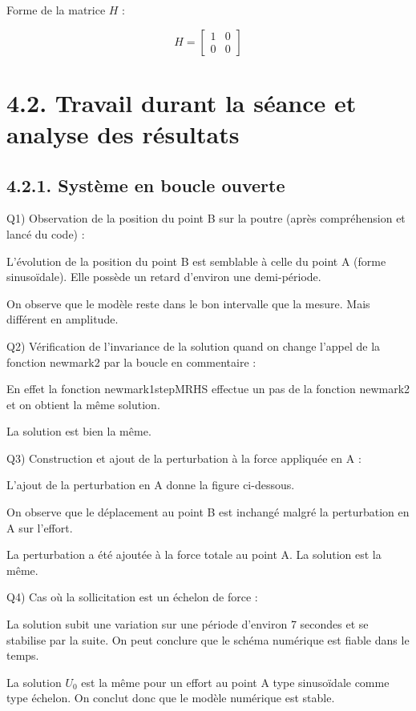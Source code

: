 \documentclass{rapportECL}
\begin{document}
Forme de la matrice $H$ :

\[ H = \begin{bmatrix} 1 & 0 \\ 0 & 0 \end{bmatrix} \]

\section{4.2. Travail durant la s\'eance et analyse des r\'esultats}

\subsection{4.2.1. Syst\`eme en boucle ouverte}

Q1) Observation de la position du point B sur la poutre (apr\`es compr\'ehension et lanc\'e du code) :

L'\'evolution de la position du point B est semblable \`a celle du point A (forme sinuso\"idale). Elle poss\`ede un retard d'environ une demi-p\'eriode.

On observe que le mod\`ele reste dans le bon intervalle que la mesure. Mais diff\'erent en amplitude.

Q2) V\'erification de l'invariance de la solution quand on change l'appel de la fonction newmark2 par la boucle en commentaire :

En effet la fonction newmark1stepMRHS effectue un pas de la fonction newmark2 et on obtient la m\^eme solution.

La solution est bien la m\^eme.

Q3) Construction et ajout de la perturbation \`a la force appliqu\'ee en A :

L'ajout de la perturbation en A donne la figure ci-dessous.

On observe que le d\'eplacement au point B est inchang\'e malgr\'e la perturbation en A sur l'effort.

La perturbation a \'et\'e ajout\'ee \`a la force totale au point A. La solution est la m\^eme.

Q4) Cas o\`u la sollicitation est un \'echelon de force :

La solution subit une variation sur une p\'eriode d'environ 7 secondes et se stabilise par la suite. On peut conclure que le sch\'ema num\'erique est fiable dans le temps.

La solution $U_0$ est la m\^eme pour un effort au point A type sinuso\"idale comme type \'echelon. On conclut donc que le mod\`ele num\'erique est stable.
\end{document}
